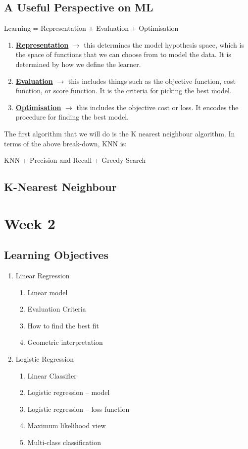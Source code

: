 \documentclass[11pt]{scrartcl}
\theoremstyle{definition}
\theoremstyle{remark}
\newcommand{\dfn}[1]{\textbf{\underline{#1}}}
\begin{document}
\subsection{A Useful Perspective on ML}
\begin{center}
	Learning = Representation + Evaluation + Optimisation
\end{center}
\begin{enumerate}[noitemsep]
	\item \dfn{Representation} $\rightarrow$ this determines the model hypothesis space, which is the space of functions that we can choose from to model the data. It is determined by how we define the learner. 
	\item \dfn{Evaluation} $\rightarrow$ this includes things such as the objective function, cost function, or score function. It is the criteria for picking the best model. 
	\item \dfn{Optimisation} $\rightarrow$ this includes the objective cost or loss. It encodes the procedure for finding the best model. 
\end{enumerate}
The first algorithm that we will do is the K nearest neighbour algorithm. In terms of the above break-down, KNN is: 
\begin{center}
	KNN + Precision and Recall + Greedy Search
\end{center}

\subsection{K-Nearest Neighbour}


\section{Week 2}
\subsection{Learning Objectives}
\begin{enumerate}[noitemsep]
	\item Linear Regression
	\begin{enumerate}[noitemsep]
		\item Linear model 
		\item Evaluation Criteria 
		\item How to find the best fit 
		\item Geometric interpretation 
	\end{enumerate}
	\item Logistic Regression
	\begin{enumerate}[noitemsep]
		\item Linear Classifier 
		\item Logistic regression -- model 
		\item Logistic regression -- loss function
		\item Maximum likelihood view 
		\item Multi-class classification
	\end{enumerate}
\end{enumerate}
\end{document}
